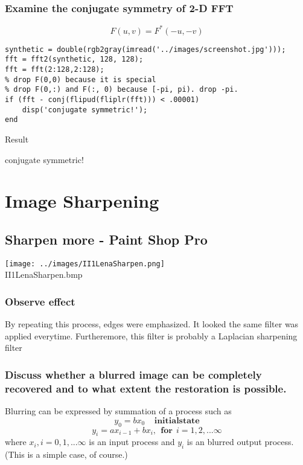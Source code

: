\documentclass[article,oneside]{memoir}
\begin{document}
\subsection{Examine the conjugate symmetry of 2-D FFT}

$$ F(u, v) = F^*(-u, -v) $$

\begin{verbatim}
synthetic = double(rgb2gray(imread('../images/screenshot.jpg')));
fft = fft2(synthetic, 128, 128);
fft = fft(2:128,2:128); 
% drop F(0,0) because it is special
% drop F(0,:) and F(:, 0) because [-pi, pi). drop -pi. 
if (fft - conj(flipud(fliplr(fft))) < .00001)
    disp('conjugate symmetric!');
end
\end{verbatim}

\noindent Result

conjugate symmetric!

\newpage

\chapter{Image Sharpening}

\section{Sharpen more - Paint Shop Pro}

\begin{center}
\texttt{[image: ../images/II1LenaSharpen.png]}\\
II1LenaSharpen.bmp
\end{center}

\subsection{Observe effect}
By repeating this process, edges were emphasized. It looked the same filter was applied everytime. 
Furtheremore, this filter is probably a Laplacian sharpening filter

\subsection{Discuss whether a blurred image can be completely recovered and to what extent the restoration is possible.}

Blurring can be expressed by summation of a process such as
$$ y_0 = b x_0 \mathbf{~~~~~initial state} $$
$$ y_i = a x_{i-1} + b x_{i}, \mathbf{~~for~~} i = 1, 2, ... \infty $$
where $ {x_i}, i = 0, 1, ... \infty $ is an input process and $ {y_i} $ is an blurred output process. (This is a simple case, of course.)
\end{document}

